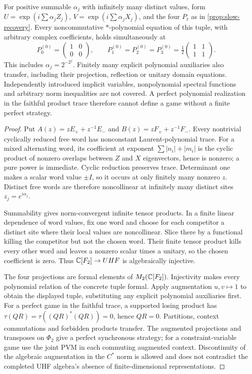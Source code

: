 \begin{proposition}\label{prop:slow-polynomial-augmentation}
For positive summable $\alpha_j$ with infinitely many distinct values, form $U=\exp(i\sum\alpha_jZ_j)$, $V=\exp(i\sum\alpha_jX_j)$, and the four $P_\ell$ as in \cref{prop:slow-recovery}. Every noncommutative $*$-polynomial equation of this tuple, with arbitrary complex coefficients, holds simultaneously at
\[
 P_0^{(0)}=\begin{pmatrix}1&0\\0&0\end{pmatrix},\qquad
 P_1^{(0)}=P_2^{(0)}=P_3^{(0)}=\tfrac12\begin{pmatrix}1&1\\1&1\end{pmatrix}.
\]
This includes $\alpha_j=2^{-2^j}$. Finitely many explicit polynomial auxiliaries also transfer, including their projection, reflection or unitary domain equations. Independently introduced implicit variables, nonpolynomial spectral functions and arbitrary norm inequalities are not covered. A perfect polynomial realization in the faithful product trace therefore cannot define a game without a finite perfect strategy.
\end{proposition}
\begin{proof}
Put $A(z)=zE_++z^{-1}E_-$ and $B(z)=zF_++z^{-1}F_-$. Every nontrivial cyclically reduced free word has nonconstant Laurent-polynomial trace. For a mixed alternating word, its coefficient at exponent $\sum|n_i|+|m_i|$ is the cyclic product of nonzero overlaps between $Z$ and $X$ eigenvectors, hence is nonzero; a pure power is immediate. Cyclic reduction preserves trace. Determinant one makes a scalar word value $\pm I$, so it occurs at only finitely many nonzero $z$. Distinct free words are therefore noncollinear at infinitely many distinct sites $z_j=e^{i\alpha_j}$.

Summability gives norm-convergent infinite tensor products. In a finite linear dependence of word values, fix one word and choose for each competitor a distinct site where their local values are noncollinear. Slice there by a functional killing the competitor but not the chosen word. Their finite tensor product kills every other word and leaves a nonzero scalar times a unitary, so the chosen coefficient is zero. Thus $\mathbb C[F_2]\to UHF$ is algebraically injective.

The four projections are formal elements of $M_2(\mathbb C[F_2])$. Injectivity makes every polynomial relation of the concrete tuple formal. Apply augmentation $u,v\mapsto1$ to obtain the displayed tuple, substituting any explicit polynomial auxiliaries first. For a perfect game in the faithful trace, a supported losing product has $\tau(QR)=\tau((QR)^*(QR))=0$, hence $QR=0$. Partitions, context commutations and forbidden products transfer. The augmented projections and transposes on $\Phi_2$ give a perfect synchronous strategy; for a constraint-variable game use the joint PVM in each commuting augmented context. Discontinuity of the algebraic augmentation in the $C^*$ norm is allowed and does not contradict the completed UHF algebra's absence of finite-dimensional representations.
\end{proof}

